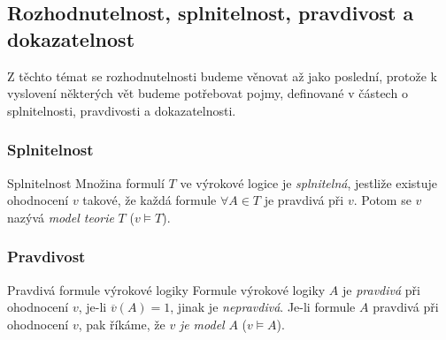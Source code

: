 \def\c#1{\mathcal{#1}}
\def\Nat{\mathbb{N}}


\subsection{Rozhodnutelnost, splnitelnost, pravdivost a dokazatelnost}

Z těchto témat se rozhodnutelnosti budeme věnovat až jako poslední, protože k vyslovení některých vět budeme potřebovat pojmy, definované v částech o splnitelnosti, pravdivosti a dokazatelnosti.

\subsubsection*{Splnitelnost}

\begin{definiceN}{Splnitelnost}
Množina formulí $T$ ve výrokové logice je \emph{splnitelná}, jestliže existuje ohodnocení $v$ takové, že každá formule $\forall A\in T$ je pravdivá při $v$. Potom se $v$ nazývá \emph{model teorie} $T$ ($v\models T$).
\end{definiceN}


\subsubsection*{Pravdivost}

\begin{definiceN}{Pravdivá formule výrokové logiky}
Formule výrokové logiky $A$ je \emph{pravdivá} při ohodnocení $v$, je-li $\overline{v}(A)=1$, jinak je \emph{nepravdivá}. Je-li formule $A$ pravdivá při ohodnocení $v$, pak říkáme, že $v$ \emph{je model} $A$ ($v\models A$). 
\end{definiceN}

